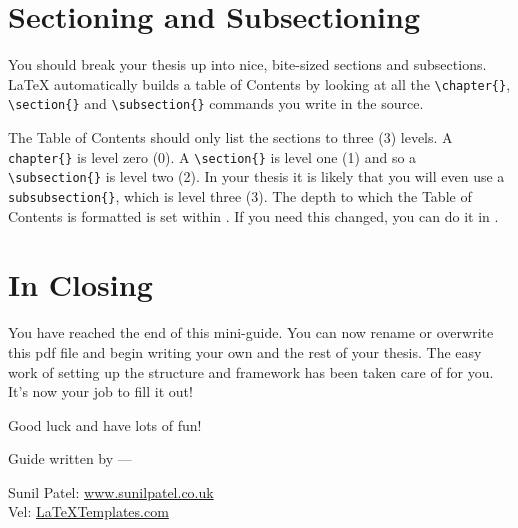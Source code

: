 
\section{Sectioning and Subsectioning}

You should break your thesis up into nice, bite-sized sections and subsections. \LaTeX{} automatically builds a table of Contents by looking at all the \verb|\chapter{}|, \verb|\section{}|  and \verb|\subsection{}| commands you write in the source. \par

The Table of Contents should only list the sections to three (3) levels. A \verb|chapter{}| is level zero (0). A \verb|\section{}| is level one (1) and so a \verb|\subsection{}| is level two (2). In your thesis it is likely that you will even use a \verb|subsubsection{}|, which is level three (3). The depth to which the Table of Contents is formatted is set within . If you need this changed, you can do it in . 


\section{In Closing}

You have reached the end of this mini-guide. You can now rename or overwrite this pdf file and begin writing your own  and the rest of your thesis. The easy work of setting up the structure and framework has been taken care of for you. It's now your job to fill it out!

Good luck and have lots of fun!

\begin{flushright}
Guide written by ---\par
Sunil Patel: \href{http://www.sunilpatel.co.uk}{www.sunilpatel.co.uk}\\
Vel: \href{http://www.LaTeXTemplates.com}{LaTeXTemplates.com}
\end{flushright}
